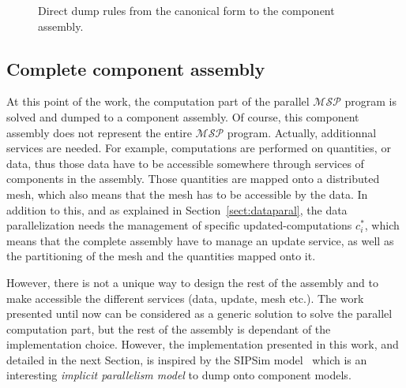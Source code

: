 \begin{figure}[h!]
\begin{center}
\caption{Direct dump rules from the canonical form to the component assembly.}
\label{fig:assembly}
\end{center}
\end{figure}

\subsection{Complete component assembly}
At this point of the work, the computation part of the parallel $\mathcal{MSP}$ program is solved and dumped to a component assembly. Of course, this component assembly does not represent the entire $\mathcal{MSP}$ program. Actually, additionnal services are needed. For example, computations are performed on quantities, or data, thus those data have to be accessible somewhere through services of components in the assembly. Those quantities are mapped onto a distributed mesh, which also means that the mesh has to be accessible by the data. In addition to this, and as explained in Section~\ref{sect:dataparal}, the data parallelization needs the management of specific updated-computations $c_i^*$, which means that the complete assembly have to manage an update service, as well as the partitioning of the mesh and the quantities mapped onto it.

However, there is not a unique way to design the rest of the assembly and to make accessible the different services (data, update, mesh etc.). The work presented until now can be considered as a generic solution to solve the parallel computation part, but the rest of the assembly is dependant of the implementation choice. However, the implementation presented in this work, and detailed in the next Section, is inspired by the SIPSim model~\cite{} which is an interesting \emph{implicit parallelism model} to dump onto component models.